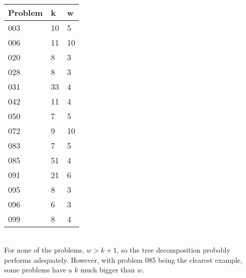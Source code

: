 ~\\\begin{tabular}{|l|l|l|}
\hline
\textbf{Problem} & \textbf{k} & \textbf{w}\\
\hline
003 & 10 & 5 \\
006 & 11 & 10 \\
020 & 8 & 3 \\
028 & 8 & 3 \\
031 & 33 & 4 \\
042 & 11 & 4 \\
050 & 7 & 5 \\
072 & 9 & 10 \\
083 & 7 & 5 \\
085 & 51 & 4 \\
091 & 21 & 6 \\
095 & 8 & 3 \\
096 & 6 & 3 \\
099 & 8 & 4 \\
\hline
\end{tabular}\\

For none of the problems, $w > k+1$, so the tree decomposition probably performs adequately. However, with problem 085 being the clearest example, some problems have a $k$ much bigger than $w$.